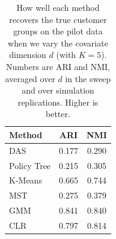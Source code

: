 \begin{table}[htbp]
\centering
\caption{How well each method recovers the true customer groups on the pilot data when we vary the covariate dimension $d$ (with $K=5$). Numbers are ARI and NMI, averaged over $d$ in the sweep and over simulation replications. Higher is better.}
\label{tab:app-ari-nmi-varying-d-avg}
\begin{tabular}{lcc}
\toprule
Method & ARI & NMI \\
\midrule
DAS & 0.177 & 0.290 \\
Policy Tree & 0.215 & 0.305 \\
K-Means & 0.665 & 0.744 \\
MST & 0.275 & 0.379 \\
GMM & 0.841 & 0.840 \\
CLR & 0.797 & 0.814 \\
\bottomrule
\end{tabular}
\end{table}
